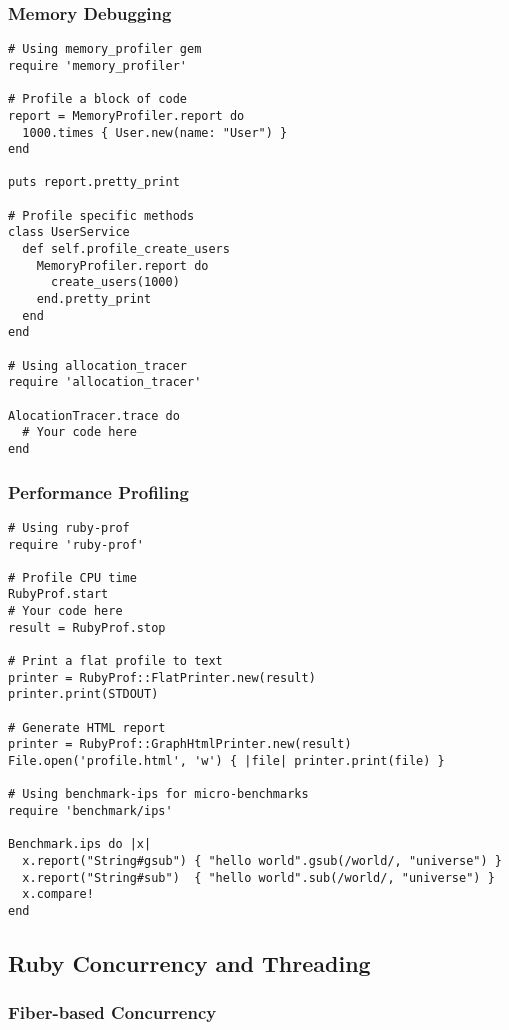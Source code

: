 \documentclass[12pt,a4paper]{article}
\begin{document}
\subsubsection{Memory Debugging}

\begin{lstlisting}
# Using memory_profiler gem
require 'memory_profiler'

# Profile a block of code
report = MemoryProfiler.report do
  1000.times { User.new(name: "User") }
end

puts report.pretty_print

# Profile specific methods
class UserService
  def self.profile_create_users
    MemoryProfiler.report do
      create_users(1000)
    end.pretty_print
  end
end

# Using allocation_tracer
require 'allocation_tracer'

AlocationTracer.trace do
  # Your code here
end
\end{lstlisting}

\subsubsection{Performance Profiling}

\begin{lstlisting}
# Using ruby-prof
require 'ruby-prof'

# Profile CPU time
RubyProf.start
# Your code here
result = RubyProf.stop

# Print a flat profile to text
printer = RubyProf::FlatPrinter.new(result)
printer.print(STDOUT)

# Generate HTML report
printer = RubyProf::GraphHtmlPrinter.new(result)
File.open('profile.html', 'w') { |file| printer.print(file) }

# Using benchmark-ips for micro-benchmarks
require 'benchmark/ips'

Benchmark.ips do |x|
  x.report("String#gsub") { "hello world".gsub(/world/, "universe") }
  x.report("String#sub")  { "hello world".sub(/world/, "universe") }
  x.compare!
end
\end{lstlisting}

\subsection{Ruby Concurrency and Threading}

\subsubsection{Fiber-based Concurrency}
\end{document}
